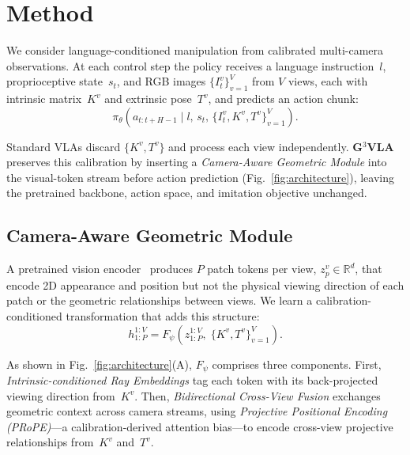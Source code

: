 \documentclass{article}
\begin{document}
\section{Method}
\label{sec:method}

We consider language-conditioned manipulation from calibrated multi-camera
observations.  At each control step the policy receives a language
instruction~$l$, proprioceptive state~$s_t$, and RGB images
$\{I_t^v\}_{v=1}^{V}$ from $V$ views, each with intrinsic matrix~$K^v$ and
extrinsic pose~$T^v$, and predicts an action chunk:
\begin{equation}
    \pi_\theta(a_{t:t+H-1}\mid l,\, s_t,\, \{I_t^v, K^v, T^v\}_{v=1}^{V}).
\end{equation}

Standard VLAs discard $\{K^v, T^v\}$ and process each view independently.
\textbf{G$^3$VLA} preserves this calibration by inserting a \emph{Camera-Aware
Geometric Module} into the visual-token stream before action prediction
(Fig.~\ref{fig:architecture}), leaving the pretrained backbone, action space,
and imitation objective unchanged.


\subsection{Camera-Aware Geometric Module}
\label{sub:geometric_module}

A pretrained vision encoder~\citep{dosovitskiy2020image, zhai2023sigmoid}
produces $P$ patch tokens per view, $z_p^v \in \mathbb{R}^d$, that encode 2D
appearance and position but not the physical viewing direction of each patch or
the geometric relationships between views.  We learn a
calibration-conditioned transformation that adds this structure:
\begin{equation}
    h_{1:P}^{1:V}
    = F_\psi\!\left(z_{1:P}^{1:V},\;\{K^v,T^v\}_{v=1}^{V}\right).
\end{equation}

As shown in Fig.~\ref{fig:architecture}(A), $F_\psi$ comprises three
components.  First, \emph{Intrinsic-conditioned Ray Embeddings} tag each token
with its back-projected viewing direction from~$K^v$.  Then,
\emph{Bidirectional Cross-View Fusion} exchanges geometric context across
camera streams, using \emph{Projective Positional Encoding
(PRoPE)}---a calibration-derived attention bias---to encode cross-view
projective relationships from~$K^v$ and~$T^v$.
\end{document}
